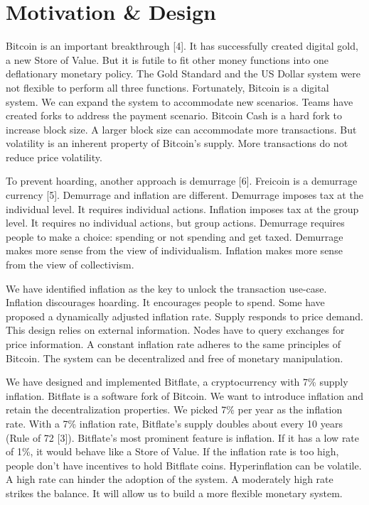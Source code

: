 \documentclass{article}      %
\begin{document}
\section{Motivation \& Design}

Bitcoin is an important breakthrough [4]. It has successfully created digital gold, a new Store of Value. But it is futile to fit other money functions into one deflationary monetary policy. The Gold Standard and the US Dollar system were not flexible to perform all three functions. Fortunately, Bitcoin is a digital system. We can expand the system to accommodate new scenarios. Teams have created forks to address the payment scenario. Bitcoin Cash is a hard fork to increase block size. A larger block size can accommodate more transactions. But volatility is an inherent property of Bitcoin's supply. More transactions do not reduce price volatility.

To prevent hoarding, another approach is demurrage [6]. Freicoin is a demurrage currency [5]. Demurrage and inflation are different. Demurrage imposes tax at the individual level. It requires individual actions. Inflation imposes tax at the group level. It requires no individual actions, but group actions. Demurrage requires people to make a choice: spending or not spending and get taxed. Demurrage makes more sense from the view of individualism. Inflation makes more sense from the view of collectivism.

We have identified inflation as the key to unlock the transaction use-case. Inflation discourages hoarding. It encourages people to spend. Some have proposed a dynamically adjusted inflation rate. Supply responds to price demand. This design relies on external information. Nodes have to query exchanges for price information. A constant inflation rate adheres to the same principles of Bitcoin. The system can be decentralized and free of monetary manipulation.

We have designed and implemented Bitflate, a cryptocurrency with 7\% supply inflation. Bitflate is a software fork of Bitcoin. We want to introduce inflation and retain the decentralization properties. We picked 7\% per year as the inflation rate. With a 7\% inflation rate, Bitflate's supply doubles about every 10 years (Rule of 72 [3]). Bitflate's most prominent feature is inflation. If it has a low rate of 1\%, it would behave like a Store of Value. If the inflation rate is too high, people don't have incentives to hold Bitflate coins. Hyperinflation can be volatile. A high rate can hinder the adoption of the system. A moderately high rate strikes the balance. It will allow us to build a more flexible monetary system.
\end{document}
